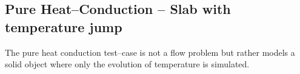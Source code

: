 \documentclass[11pt,a4paper,twoside]{report}
\begin{document}

\subsection{Pure Heat--Conduction  -- Slab with temperature jump}

The pure heat conduction test--case is not a flow problem but rather models a solid object where only the evolution of temperature is simulated. 
\end{document}
